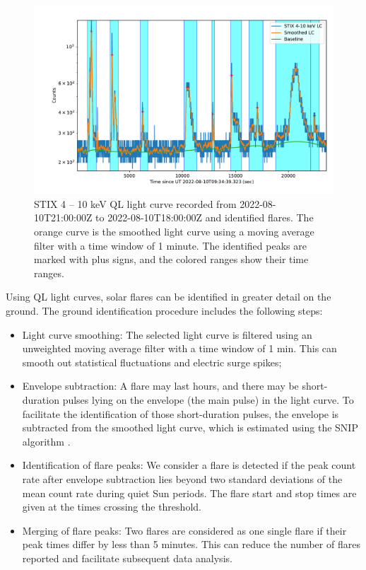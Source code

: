 \documentclass[referee]{preaa} %
\begin{document}
\begin{figure}
  \centering
  \includegraphics[width=0.8\linewidth]{figures/flaredet.pdf}
  \caption{STIX 4 -- 10 keV QL light curve recorded from 2022-08-10T21:00:00Z to 2022-08-10T18:00:00Z and  identified flares. The orange curve is the smoothed light curve using a moving average filter with a time window of 1 minute. 
  The identified peaks are marked with plus signs, and the colored ranges show their time ranges.
  }
  \label{fig:flare-det}
\end{figure}
Using QL light curves, solar flares can be identified in greater detail on the ground. 
The ground identification procedure includes the following steps:
\begin{itemize}
  \item Light curve smoothing: The selected light curve is filtered using an unweighted
  moving average filter with a time window of 1 min. This can smooth out statistical fluctuations and electric surge spikes;
  \item Envelope subtraction:  A flare may last hours, and there may be short-duration pulses lying on the envelope (the main pulse) in the light curve.  To facilitate the identification of those short-duration pulses, the envelope is subtracted from the smoothed light curve, which is estimated using the SNIP algorithm \citep{snip}. 
  \item Identification of flare peaks: We consider a flare is detected 
 if the peak count rate after envelope subtraction lies beyond two standard deviations 
 of the mean count rate during quiet Sun periods. 
  The flare start and stop times are given at the times crossing the threshold.  
  \item Merging of flare peaks: Two flares are considered as one single flare if their peak times differ by less than 5 minutes. This can reduce the number of flares reported and facilitate subsequent data analysis.  
\end{itemize}
\end{document}
